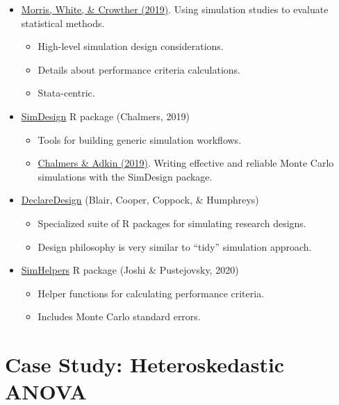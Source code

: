 \documentclass[
]{book}
\providecommand{\tightlist}{%
  \setlength{\itemsep}{0pt}\setlength{\parskip}{0pt}}
\begin{document}
\begin{itemize}
\item
  \href{https://doi.org/10.1002/sim.8086}{Morris, White, \& Crowther (2019)}. Using simulation studies to evaluate statistical methods.

  \begin{itemize}
  \tightlist
  \item
    High-level simulation design considerations.
  \item
    Details about performance criteria calculations.
  \item
    Stata-centric.
  \end{itemize}
\item
  \href{https://github.com/philchalmers/SimDesign/wiki}{SimDesign} R package (Chalmers, 2019)

  \begin{itemize}
  \tightlist
  \item
    Tools for building generic simulation workflows.
  \item
    \href{http://www.tqmp.org/RegularArticles/vol16-4/p248/}{Chalmers \& Adkin (2019)}. Writing effective and reliable Monte Carlo simulations with the SimDesign package.
  \end{itemize}
\item
  \href{https://declaredesign.org/}{DeclareDesign} (Blair, Cooper, Coppock, \& Humphreys)

  \begin{itemize}
  \tightlist
  \item
    Specialized suite of R packages for simulating research designs.
  \item
    Design philosophy is very similar to ``tidy'' simulation approach.
  \end{itemize}
\item
  \href{https://meghapsimatrix.github.io/simhelpers/index.html}{SimHelpers} R package (Joshi \& Pustejovsky, 2020)

  \begin{itemize}
  \tightlist
  \item
    Helper functions for calculating performance criteria.
  \item
    Includes Monte Carlo standard errors.
  \end{itemize}
\end{itemize}

\hypertarget{case_ANOVA}{%
\chapter{Case Study: Heteroskedastic ANOVA}\label{case_ANOVA}}
\end{document}
